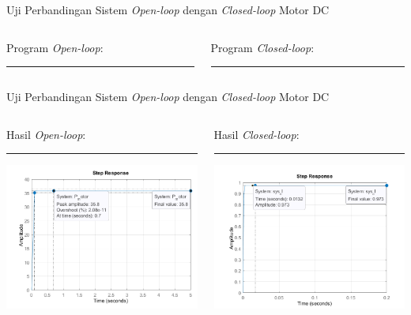 \documentclass[10pt,xcolor={dvipsnames}]{beamer}
\begin{document}
\begin{frame}{Uji Perbandingan Sistem \textit{Open-loop} dengan \textit{Closed-loop} Motor DC}
	\begin{columns}[T] %
		\begin{column}{0.48\textwidth}
			Program \textit{Open-loop}:
			\color{black}\rule{\linewidth}{4pt}
			
		\end{column}%
		\hfill%
		\begin{column}{.48\textwidth}
			Program \textit{Closed-loop}:
			\color{blue}\rule{\linewidth}{4pt}
			\begin{center}
				
			\end{center}
		\end{column}
	\end{columns}
\end{frame}

\begin{frame}{Uji Perbandingan Sistem \textit{Open-loop} dengan \textit{Closed-loop} Motor DC}
	\begin{columns}[T] %
		\begin{column}{0.48\textwidth}
			Hasil \textit{Open-loop}:
			\color{black}\rule{\linewidth}{4pt}
			\includegraphics[width=7.5cm]{Matlab/olDCSpeed.png}
		\end{column}%
		\hfill%
		\begin{column}{0.48\textwidth}
			Hasil \textit{Closed-loop}:
			\color{blue}\rule{\linewidth}{4pt}
			\begin{center}
				\includegraphics[width=7.5cm]{Matlab/clDCSpeed.png}
			\end{center}
		\end{column}
	\end{columns}
\end{frame}
\end{document}
